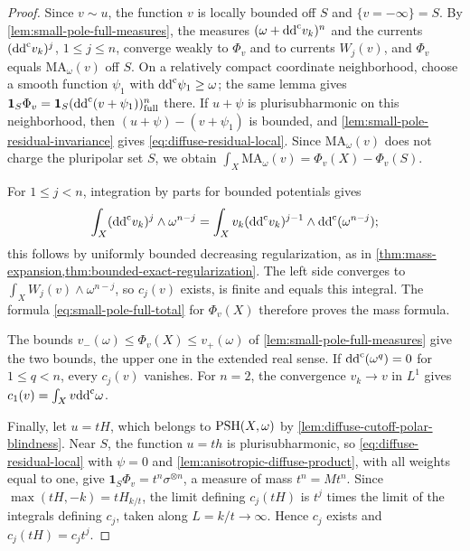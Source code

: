 \begin{proof}
Since $v\sim u$, the function $v$ is locally bounded off $S$ and $\{v=-\infty\}=S$. By \cref{lem:small-pole-full-measures}, the measures $(\omega+\mathrm{dd}^{\mathrm{c}} v_k)^n$ and the currents $(\mathrm{dd}^{\mathrm{c}} v_k)^j$, $1\leq j\leq n$, converge weakly to $\Phi_v$ and to currents $W_j(v)$, and $\Phi_v$ equals $\mathrm{MA}_\omega(v)$ off $S$. On a relatively compact coordinate neighborhood, choose a smooth function $\psi_1$ with $\mathrm{dd}^{\mathrm{c}}\psi_1\geq\omega$; the same lemma gives $\mathbf1_S\Phi_v=\mathbf1_S(\mathrm{dd}^{\mathrm{c}}(v+\psi_1))^n_{\mathrm{full}}$ there. If $u+\psi$ is plurisubharmonic on this neighborhood, then $(u+\psi)-(v+\psi_1)$ is bounded, and \cref{lem:small-pole-residual-invariance} gives \eqref{eq:diffuse-residual-local}. Since $\mathrm{MA}_\omega(v)$ does not charge the pluripolar set $S$, we obtain $\int_X\mathrm{MA}_\omega(v)=\Phi_v(X)-\Phi_v(S)$.

For $1\leq j<n$, integration by parts for bounded potentials gives
\[
 \int_X(\mathrm{dd}^{\mathrm{c}} v_k)^j\wedge\omega^{n-j}
       =\int_Xv_k(\mathrm{dd}^{\mathrm{c}} v_k)^{j-1}
                           \wedge\mathrm{dd}^{\mathrm{c}}(\omega^{n-j});
\]
this follows by uniformly bounded decreasing regularization, as in \cref{thm:mass-expansion,thm:bounded-exact-regularization}. The left side converges to $\int_XW_j(v)\wedge\omega^{n-j}$, so $c_j(v)$ exists, is finite and equals this integral. The formula \eqref{eq:small-pole-full-total} for $\Phi_v(X)$ therefore proves the mass formula.

The bounds $v_-(\omega)\leq\Phi_v(X)\leq v_+(\omega)$ of \cref{lem:small-pole-full-measures} give the two bounds, the upper one in the extended real sense. If $\mathrm{dd}^{\mathrm{c}}(\omega^q)=0$ for $1\leq q<n$, every $c_j(v)$ vanishes. For $n=2$, the convergence $v_k\to v$ in $L^1$ gives $c_1(v)=\int_Xv\mathrm{dd}^{\mathrm{c}}\omega$.

Finally, let $u=tH$, which belongs to $\mathrm{PSH}(X,\omega)$ by \cref{lem:diffuse-cutoff-polar-blindness}. Near $S$, the function $u=th$ is plurisubharmonic, so \eqref{eq:diffuse-residual-local} with $\psi=0$ and \cref{lem:anisotropic-diffuse-product}, with all weights equal to one, give $\mathbf1_S\Phi_v=t^n\sigma^{\otimes n}$, a measure of mass $t^n=Mt^n$. Since $\max(tH,-k)=tH_{k/t}$, the limit defining $c_j(tH)$ is $t^j$ times the limit of the integrals defining $c_j$, taken along $L=k/t\to\infty$. Hence $c_j$ exists and $c_j(tH)=c_jt^j$.
\end{proof}


